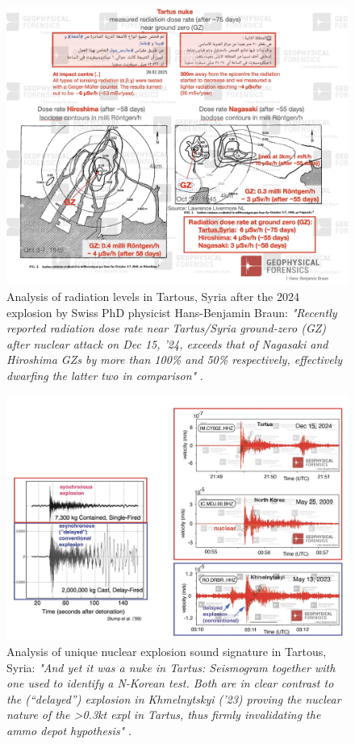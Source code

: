 \documentclass[10pt,twocolumn,letterpaper]{article}
\begin{document}
\begin{figure}[t]
\begin{center}
\includegraphics[width=1\textwidth]{tartous.jpeg}
\end{center}
   \caption{Analysis of radiation levels in Tartous, Syria after the 2024 explosion by Swiss PhD physicist Hans-Benjamin Braun: \textit{"Recently reported radiation dose rate near Tartus/Syria ground-zero (GZ) after nuclear attack on Dec 15, ’24, exceeds that of Nagasaki and Hiroshima GZs by more than 100\% and 50\% respectively, effectively dwarfing the latter two in comparison"} \cite{34}.}
   \label{fig:15}
\end{figure}

\begin{figure}[t]
\begin{center}
\includegraphics[width=1\textwidth]{sound.jpeg}
\end{center}
   \caption{Analysis of unique nuclear explosion sound signature in Tartous, Syria: \textit{"And yet it was a nuke in Tartus: Seismogram together with one used to identify a N-Korean test.  Both are in clear contrast to the (“delayed”) explosion in Khmelnytskyi (’23) proving the nuclear nature of the >0.3kt expl in Tartus, thus firmly invalidating the ammo depot hypothesis"} \cite{34}.}
   \label{fig:16}
\end{figure}
\end{document}
